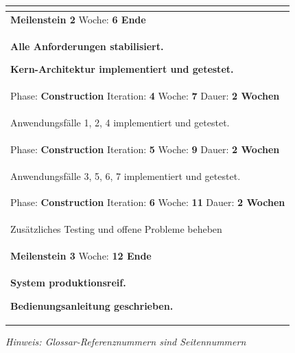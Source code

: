 \documentclass[11pt,ngerman]{article}
\begin{document}
\begin{tabularx}{\textwidth}{X}
\begin{compactitem}
	\end{compactitem}\\
	\toprule
	\rowcolor{lightgray}
	\textbf{Meilenstein 2} Woche: \textbf{6 Ende}\\
	\rowcolor{lightgray}
	\begin{compactitem}
		\item \textbf{Alle Anforderungen stabilisiert.}
		\item \textbf{Kern-Architektur implementiert und getestet.}
	\end{compactitem}\\
	\toprule
	Phase: \textbf{Construction} Iteration: \textbf{4} Woche: \textbf{7} Dauer: \textbf{2 Wochen}\\
	\begin{compactitem}
		\item Anwendungsfälle 1, 2, 4 implementiert und getestet.
	\end{compactitem}\\
	\toprule
	Phase: \textbf{Construction} Iteration: \textbf{5} Woche: \textbf{9} Dauer: \textbf{2 Wochen}\\
	\begin{compactitem}
		\item Anwendungsfälle 3, 5, 6, 7 implementiert und getestet.
	\end{compactitem}\\
	\toprule
	Phase: \textbf{Construction} Iteration: \textbf{6} Woche: \textbf{11} Dauer: \textbf{2 Wochen}\\
	\begin{compactitem}
		\item Zusätzliches Testing und offene Probleme beheben
	\end{compactitem}\\
	\toprule
	\rowcolor{lightgray}
	\textbf{Meilenstein 3} Woche: \textbf{12 Ende}\\
	\rowcolor{lightgray}
	\begin{compactitem}
		\item \textbf{System produktionsreif.}
		\item \textbf{Bedienungsanleitung geschrieben.}
	\end{compactitem}\\
	\bottomrule
\end{tabularx}
    \listoffigures
    \listoftables
    \printbibliography
    \printglossary
    \textit{Hinweis: Glossar-Referenznummern sind Seitennummern}

\newpage
\end{document}

